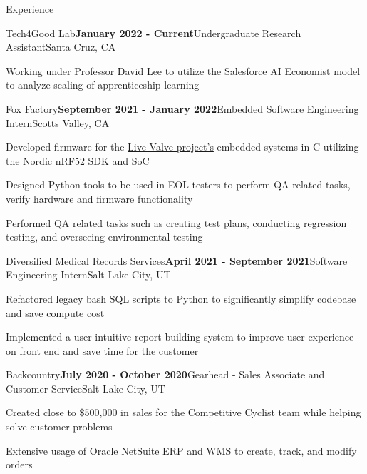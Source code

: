 \documentclass{resume}
\begin{document}
\begin{rSection}{\large Experience}


\begin{rSubsection}{Tech4Good Lab}{\bf{January 2022 - Current}}{Undergraduate Research Assistant}{Santa Cruz, CA }
\item Working under Professor David Lee to utilize the \href{https://github.com/salesforce/ai-economist}{Salesforce AI Economist model} to analyze scaling of apprenticeship learning
\end{rSubsection}

\begin{rSubsection}{Fox Factory}{\bf{September 2021 - January 2022}}{Embedded Software Engineering Intern}{Scotts Valley, CA }
\item Developed firmware for the \href{https://www.pinkbike.com/news/fox-updates-live-valve-electonic-suspension-for-2022.html}{Live Valve project's} embedded systems in C utilizing the Nordic nRF52 SDK and SoC
\item Designed Python tools to be used in EOL testers to perform QA related tasks, verify hardware and firmware functionality
\item Performed QA related tasks such as creating test plans, conducting regression testing, and overseeing environmental testing
\end{rSubsection}

\begin{rSubsection}{Diversified Medical Records Services}{\bf{April 2021 - September 2021}}{Software Engineering Intern}{Salt Lake City, UT }
\item Refactored legacy bash SQL scripts to Python to significantly simplify codebase and save compute cost
\item Implemented a user-intuitive report building system to improve user experience on front end and save time for the customer
\end{rSubsection}

\begin{rSubsection}{Backcountry}{\bf{July 2020 - October 2020}}{Gearhead - Sales Associate and Customer Service}{Salt Lake City, UT }
\item Created close to \$500,000 in sales for the Competitive Cyclist team while helping solve customer problems
\item Extensive usage of Oracle NetSuite ERP and WMS to create, track, and modify orders
\end{rSubsection}


\end{rSection}
\end{document}
